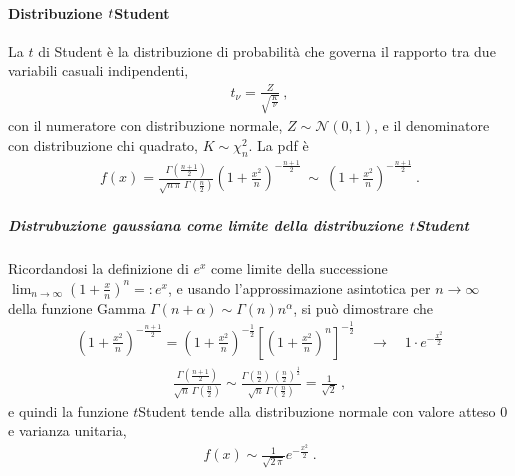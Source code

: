 \documentclass[letterpaper,10pt,italian]{jupyterBook}
\begin{document}
\paragraph{Distribuzione \protect\(t\protect\)\sphinxhyphen{}Student}
\label{\detokenize{ch/statistics/rv_pdf_examples:distribuzione-t-student}}
\sphinxAtStartPar
La \(t\) di Student è la distribuzione di probabilità che governa il rapporto tra due variabili casuali indipendenti,
\begin{equation*}
\begin{split}t_{\nu} = \frac{Z}{\sqrt{\frac{K}{\nu}}} \ ,\end{split}
\end{equation*}
\sphinxAtStartPar
con il numeratore con distribuzione normale, \(Z \sim \mathscr{N}(0,1)\), e il denominatore con distribuzione chi quadrato, \(K \sim \chi^2_n\). La pdf è
\begin{equation*}
\begin{split}f(x) = \frac{\Gamma\left(\frac{n+1}{2}\right)}{\sqrt{n \, \pi} \, \Gamma\left(\frac{n}{2}\right)} \left( 1 + \frac{x^2}{n} \right)^{-\frac{n + 1}{2}} \ \sim \ \left( 1 + \frac{x^2}{n} \right)^{-\frac{n + 1}{2}} \ .\end{split}
\end{equation*}

\subparagraph{Distrubuzione gaussiana come limite della distribuzione \protect\(t\protect\)\sphinxhyphen{}Student}
\label{\detokenize{ch/statistics/rv_pdf_examples:distrubuzione-gaussiana-come-limite-della-distribuzione-t-student}}
\sphinxAtStartPar
Ricordandosi la definizione di \(e^x\) come limite della successione \(\lim_{n \rightarrow \infty} \left( 1 + \frac{x}{n} \right)^n =: e^x\), e usando l’approssimazione asintotica per \(n \rightarrow \infty\) della funzione Gamma \(\Gamma(n+\alpha) \sim \Gamma(n)n^{\alpha}\), si può dimostrare che
\begin{equation*}
\begin{split}\left( 1 + \frac{x^2}{n} \right)^{-\frac{n+1}{2}} = \left( 1 + \frac{x^2}{n} \right)^{-\frac{1}{2}} \left[ \left( 1 + \frac{x^2}{n} \right)^n \right]^{-\frac{1}{2}} \quad \rightarrow \quad 1 \cdot e^{-\frac{x^2}{2}}\end{split}
\end{equation*}\begin{equation*}
\begin{split}\frac{\Gamma\left(\frac{n+1}{2}\right)}{\sqrt{n} \, \Gamma\left( \frac{n}{2} \right)} \sim
  \frac{\Gamma\left(\frac{n}{2}\right) \, \left(\frac{n}{2}\right)^{\frac{1}{2}}}{\sqrt{n} \, \Gamma\left( \frac{n}{2} \right)} = \frac{1}{\sqrt{2}} \ , \end{split}
\end{equation*}
\sphinxAtStartPar
e quindi la funzione \(t\)\sphinxhyphen{}Student tende alla distribuzione normale con valore atteso \(0\) e varianza unitaria,
\begin{equation*}
\begin{split}f(x) \sim \frac{1}{\sqrt{2 \,\pi}} e^{-\frac{x^2}{2}} \ .\end{split}
\end{equation*}
\sphinxstepscope
\end{document}
